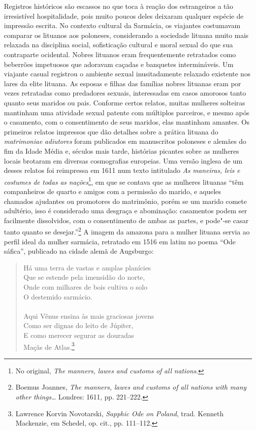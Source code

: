 Registros históricos são escassos no que toca à reação dos estrangeiros
a tão irresistível hospitalidade, pois muito poucos deles deixaram
qualquer espécie de impressão escrita. No contexto cultural da Sarmácia,
os viajantes costumavam comparar os lituanos aos poloneses, considerando
a sociedade lituana muito mais relaxada na disciplina social,
sofisticação cultural e moral sexual do que sua contraparte ocidental.
Nobres lituanos eram frequentemente retratados como beberrões impetuosos
que adoravam caçadas e banquetes intermináveis. Um viajante casual
registrou o ambiente sexual inusitadamente relaxado existente nos lares
da elite lituana. As esposas e filhas das famílias nobres lituanas eram
por vezes retratadas como predadores sexuais, interessadas em casos
amorosos tanto quanto seus maridos ou pais. Conforme certos relatos,
muitas mulheres solteiras mantinham uma atividade sexual patente com
múltiplos parceiros, e mesmo após o casamento, com o consentimento de
seus maridos, elas mantinham amantes. Os primeiros relatos impressos que
dão detalhes sobre a prática lituana do \textit{matrimoniae adiutores}
foram publicados em manuscritos poloneses e alemães do fim da Idade
Média e, séculos mais tarde, histórias picantes sobre as mulheres locais
brotaram em diversas cosmografias europeias. Uma versão inglesa de um
desses relatos foi reimpressa em 1611 num texto intitulado \textit{As maneiras, leis 
e costumes de todas as nações}\footnote{No original, \textit{The
manners, lawes and customs of all nations}.}, em que se contava que as
mulheres lituanas ``têm companheiros de quarto e amigos com a permissão
do marido, e aqueles chamados ajudantes ou promotores do matrimônio,
porém se um marido comete adultério, isso é considerado uma desgraça e
abominação: casamentos podem ser facilmente dissolvidos, com o
consentimento de ambas as partes, e pode"-se casar tanto quanto se
desejar.''\footnote{Boemus Joannes, \textit{The manners, lawes and customs of all nations with many other things\ldots{}} Londres: 1611, pp. 221--222.} A imagem da amazona para a mulher lituana servia ao perfil ideal da mulher sarmácia, retratado em 1516 em latim no poema ``Ode
sáfica'', publicado na cidade alemã de Augsburgo:

\begin{verse}
Há uma terra de vastas e amplas planícies\\
Que se estende pela imensidão do norte,\\
Onde com milhares de bois cultiva o solo\\
O destemido sarmácio.\\
\smallskip
[\ldots{}]\\
\smallskip
Aqui Vênus ensina às mais graciosas jovens\\
Como ser dignas do leito de Júpiter,\\
E como merecer segurar as douradas\\
Maçãs de Atlas.\footnote{Lawrence Korvin Novotarski, \textit{Sapphic Ode on Poland}, trad. Kenneth Mackenzie, em Schedel, op. cit., pp. 111--112.}
\end{verse}

